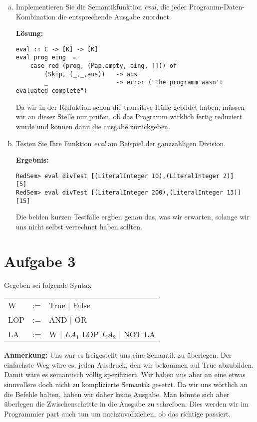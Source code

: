\documentclass[11pt,a4paper,ngerman]{article}
\begin{document}
\begin{enumerate}[a)]
    \item   Implementieren Sie die Semantikfunktion \emph{eval}, die jeder Programm-Daten-Kombination
            die entsprechende Ausgabe zuordnet.

            \textbf{Lösung:}\\
            \begin{lstlisting}
eval :: C -> [K] -> [K]
eval prog eing  = 
    case red (prog, (Map.empty, eing, [])) of
        (Skip, (_,_,aus))   -> aus
        _                   -> error ("The programm wasn't evaluated complete")
            \end{lstlisting}

            Da wir in der Reduktion schon die transitive Hülle gebildet haben, müssen wir an dieser
            Stelle nur prüfen, ob das Programm wirklich fertig reduziert wurde und können dann
            die ausgabe zurückgeben.

    \item   Testen Sie Ihre Funktion \emph{eval} am Beispiel der ganzzahligen Division.

            \textbf{Ergebnis:}\\
            \begin{lstlisting}
RedSem> eval divTest [(LiteralInteger 10),(LiteralInteger 2)]
[5]
RedSem> eval divTest [(LiteralInteger 200),(LiteralInteger 13)]
[15]
            \end{lstlisting}
            Die beiden kurzen Testfälle ergben genau das, was wir erwarten, solange wir uns nicht
            selbst verrechnet haben sollten.
\end{enumerate}


\section*{Aufgabe 3}

Gegeben sei folgende Syntax
\begin{tabular}{lcl}
W   & := &  True | False\\
LOP & := &  AND | OR\\
LA  & := &  W | $LA_1$ LOP $LA_2$ | NOT LA 
\end{tabular}

\textbf{Anmerkung:} Uns war es freigestellt uns eine Semantik zu überlegen.
                    Der einfachste Weg wäre es, jeden Ausdruck, den wir bekommen
                    auf True abzubilden. Damit wäre es semantisch völlig
                    spezifiziert. Wir haben uns aber an eine etwas sinnvollere
                    doch nicht zu komplizierte Semantik gesetzt. Da wir uns
                    wörtlich an die Befehle halten, haben wir daher keine Ausgabe.
                    Man könnte sich aber überlegen die Zwischenschritte in die
                    Ausgabe zu schreiben. Dies werden wir im Programmier part auch tun
                    um nachzuvollziehen, ob das richtige passiert.
\end{document}
